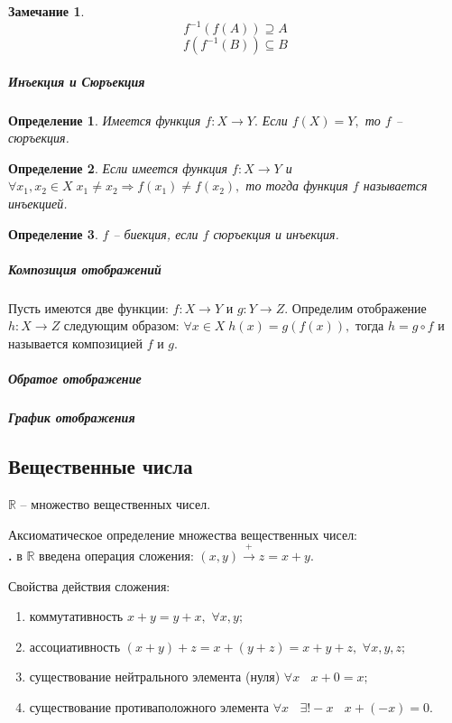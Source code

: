 \documentclass{article}
\newcommand{\RomanNumeralCaps}[1]
    {\MakeUppercase{\romannumeral #1}}
\newtheorem{Remark}{Замечание}[section]
\newtheorem{Definition}{Определение}[section]
\begin{document}
\begin{Remark}
$$f^{-1}\left(f(A)\right)\supseteq  A$$
$$f\left(f^{-1}(B)\right) \subseteq B$$
\end{Remark}

\subparagraph{Инъекция и Сюръекция}
\begin{Definition}
Имеется функция $f:X \rightarrow Y.$ Если $f(X)=Y,$ то $f$ -- сюръекция.
\end{Definition}
\begin{Definition}
Если имеется функция $f:X \rightarrow Y$ и $\forall x_1, x_2 \in X \; x_1 \neq x_2 \Rightarrow f(x_1)\neq f(x_2),$ то тогда функция $f$ называется инъекцией.
\end{Definition}
\begin{Definition}
$f$ -- биекция, если $f$ сюръекция и инъекция.
\end{Definition} 

\subparagraph{Композиция отображений}
Пусть имеются две функции: $f:X \rightarrow Y$ и $g:Y \rightarrow Z.$
Определим отображение $h:X \rightarrow Z$ следующим образом: $\forall x\in X \; h(x)=g(f(x)),$ тогда $h=g\circ f$ и называется композицией $f$ и $g.$


\subparagraph{Обратое отображение}
\subparagraph{График отображения}


\subsection{Вещественные  числа}
$\mathbb{R}$ -- множество вещественных чисел.

Аксиоматическое определение множества вещественных чисел:\\

{\bf \RomanNumeralCaps{1}.} в $\mathbb{R}$ введена операция сложения: $(x,y) \xrightarrow{\text{+}} z=x+y.$
\par Свойства действия сложения:
\begin{enumerate}
\item коммутативность \quad  $x+y=y+x,$ $\forall x, y ;$
\item ассоциативность \quad  $(x+y)+z=x+(y+z)=x+y+z,$ $\forall x, y, z ;$
\item существование нейтрального элемента (нуля) \quad $\forall x\;\;$ $x+0=x;$
\item существование противаположного элемента \quad $\forall x\;\;$  $\exists ! -x\;\;$ $x+(-x)=0.$
\end{enumerate}
\end{document}
